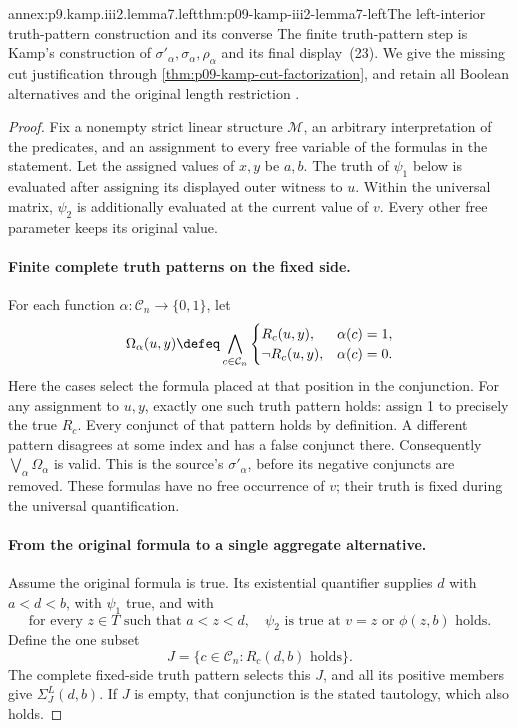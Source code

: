 \begin{annexitem}{annex:p9.kamp.iii2.lemma7.left}{thm:p09-kamp-iii2-lemma7-left}{The left-interior truth-pattern construction and its converse}
The finite truth-pattern step is Kamp's construction of
\(\sigma'_\alpha,\sigma_\alpha,\rho_\alpha\) and its final
display~(23). We give the missing cut justification through
\cref{thm:p09-kamp-cut-factorization}, and retain all Boolean
alternatives and the original length restriction
\cite[ch.~III, pp.~80--83]{Kamp1968}.

\begin{proof}
Fix a nonempty strict linear structure \(\mathcal M\), an arbitrary
interpretation of the predicates, and an assignment to every free
variable of the formulas in the statement. Let the assigned values of
\(x,y\) be \(a,b\). The truth of \(\psi_1\) below is
evaluated after assigning its displayed outer witness to \(u\).
Within the universal matrix, \(\psi_2\) is additionally evaluated
at the current value of \(v\). Every other free parameter keeps
its original value.

\paragraph{Finite complete truth patterns on the fixed side.}
For each function \(\alpha:\mathcal C_n\to\{0,1\}\), let
\[
 \Omega_\alpha(u,y)\defeq
 \bigwedge_{c\in\mathcal C_n}
 \begin{cases}
 R_c(u,y),&\alpha(c)=1,\\
 \neg R_c(u,y),&\alpha(c)=0.
 \end{cases}
\]
Here the cases select the formula placed at that position in the
conjunction. For any assignment to \(u,y\), exactly one such
truth pattern holds: assign 1 to precisely the true \(R_c\).
Every conjunct of that pattern holds by definition. A different
pattern disagrees at some index and has a false conjunct there.
Consequently \(\bigvee_\alpha\Omega_\alpha\) is valid.
This is the source's \(\sigma'_\alpha\), before its negative
conjuncts are removed. These formulas have no free occurrence of
\(v\); their truth is fixed during the universal quantification.

\paragraph{From the original formula to a single aggregate alternative.}
Assume the original formula is true. Its existential quantifier
supplies \(d\) with \(a<d<b\), with \(\psi_1\) true,
and with
\[
 \text{for every }z\in T\text{ such that }a<z<d,
       \quad \psi_2\text{ is true at }v=z
                      \text{ or }\phi(z,b)\text{ holds}.
 \tag{1}
\]
Define the one subset
\[
                     J=\{c\in\mathcal C_n:R_c(d,b)\text{ holds}\}.
\]
The complete fixed-side truth pattern selects this \(J\), and
all its positive members give \(\Sigma_J^L(d,b)\).
If \(J\) is empty, that conjunction is the stated tautology,
which also holds.


\end{proof}
\end{annexitem}
